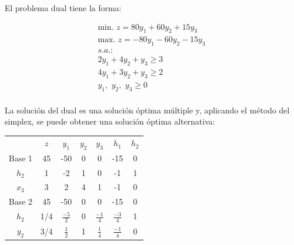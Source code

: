 El problema dual tiene la forma:

\begin{equation}
\begin{split}
\mbox{min. } z = 80y_1 + 60y_2 + 15y_3\\
\mbox{max. } z = - 80y_1 - 60y_2 - 15y_3\\
s.a.:\\
2y_1 + 4y_2 + y_3 \geq 3\\
4y_1 + 3y_2 + y_3 \geq 2\\
y_1,\,\,y_2,\,\,y_3\geq 0\\
\end{split}
\end{equation}

La solución del dual es una solución óptima múltiple y, aplicando el método del simplex, se puede obtener una solución óptima alternativa:

\begin{center}
\begin{tabular}{c|c|ccccc|}
 & $z$ & $y_1$ & $y_2$ & $y_3$ & $h_1$ & $h_2$\\ 
 Base 1 & 45 & -50 & 0 & 0 & -15 & 0 \\ 
\hline
$h_2$ & 1  & -2 & 1 & 0 & -1 & 1\\ 
$x_3$ & 3  & 2 & 4 & 1 & -1 & 0\\ 
\hline
Base 2  & 45 & -50 & 0 & 0 & -15 & 0 \\ 
\hline
$h_2$ & 1/4  & $\frac{-5}{2}$ & 0 & $\frac{-1}{4}$ & $\frac{-3}{4}$ & 1\\ 
$y_2$ & 3/4  & $\frac{1}{2}$ & 1 & $\frac{1}{4}$ & $\frac{-1}{4}$ & 0\\ 
\hline
\end{tabular}
\end{center}





